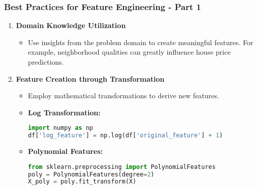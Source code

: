 \documentclass[aspectratio=169]{beamer}
\begin{document}
\begin{frame}
    \frametitle{Best Practices for Feature Engineering - Part 1}
    \begin{enumerate}
        \item \textbf{Domain Knowledge Utilization}
        \begin{itemize}
            \item Use insights from the problem domain to create meaningful features. For example, neighborhood qualities can greatly influence house price predictions.
        \end{itemize}
        
        \item \textbf{Feature Creation through Transformation}
        \begin{itemize}
            \item Employ mathematical transformations to derive new features.
            \item \textbf{Log Transformation:}
            \begin{lstlisting}[language=Python]
import numpy as np
df['log_feature'] = np.log(df['original_feature'] + 1)
            \end{lstlisting}
            \item \textbf{Polynomial Features:}
            \begin{lstlisting}[language=Python]
from sklearn.preprocessing import PolynomialFeatures
poly = PolynomialFeatures(degree=2)
X_poly = poly.fit_transform(X)
            \end{lstlisting}
        \end{itemize}
    \end{enumerate}
\end{frame}
\end{document}
